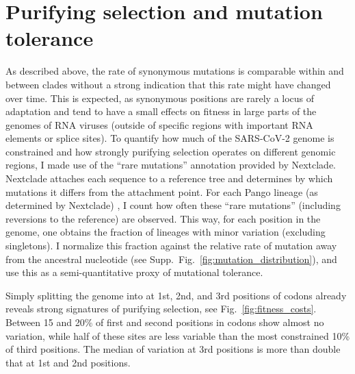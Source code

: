 \documentclass[aps,rmp, twocolumn]{revtex4}
\begin{document}



\section*{Purifying selection and mutation tolerance}

As described above, the rate of synonymous mutations is comparable within and between clades without a strong indication that this rate might have changed over time.
This is expected, as synonymous positions are rarely a locus of adaptation and tend to have a small effects on fitness in large parts of the genomes of RNA viruses \citep{zanini_vivo_2017} (outside of specific regions with important RNA elements or splice sites).
To quantify how much of the SARS-CoV-2 genome is constrained and how strongly purifying selection operates on different genomic regions, I made use of the ``rare mutations'' annotation provided by Nextclade.
Nextclade attaches each sequence to a reference tree and determines by which mutations it differs from the attachment point.
For each Pango lineage (as determined by Nextclade) \citep{rambaut_dynamic_2020,aksamentov_nextclade_2021}, I count how often these ``rare mutations'' (including reversions to the reference) are observed.
This way, for each position in the genome, one obtains the fraction of lineages with minor variation (excluding singletons).
I normalize this fraction against the relative rate of mutation away from the ancestral nucleotide (see Supp.~Fig.~\ref{fig:mutation_distribution}), and use this as a semi-quantitative proxy of mutational tolerance.

Simply splitting the genome into at 1st, 2nd, and 3rd positions of codons already reveals strong signatures of purifying selection, see Fig.~\ref{fig:fitness_costs}.
Between 15 and 20\% of first and second positions in codons show almost no variation, while half of these sites are less variable than the most constrained 10\% of third positions.
The median of variation at 3rd positions is more than double that at 1st and 2nd positions.
\end{document}
